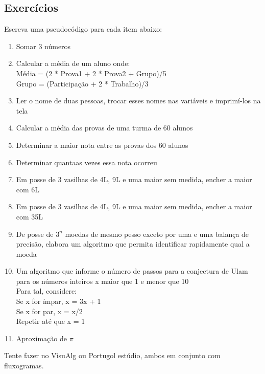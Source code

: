 \documentclass[12pt,a4paper]{article} %
\begin{document}
		\subsection{Exercícios}
		Escreva uma pseudocódigo para cada item abaixo:
			\begin{enumerate}
				\item Somar 3 números
				\item Calcular a média de um aluno onde:\\Média = (2 * Prova1 + 2 * Prova2 + Grupo)/5\\Grupo = (Participação + 2 * Trabalho)/3
				\item Ler o nome de duas pessoas, trocar esses nomes nas variáveis e imprimí-los na tela
				\item Calcular a média das provas de uma turma de 60 alunos
				\item Determinar a maior nota entre as provas dos 60 alunos
				\item Determinar quantaas vezes essa nota ocorreu
				\item Em posse de 3 vasilhas de 4L, 9L e uma maior sem medida, encher a maior com 6L
				\item Em posse de 3 vasilhas de 4L, 9L e uma maior sem medida, encher a maior com 35L
				\item De posse de $3^{n}$ moedas de mesmo pesso exceto por uma e uma balança de precisão, elabora um algoritmo que permita identificar rapidamente qual a moeda
				\item Um algoritmo que informe o número de passos para a conjectura de Ulam para os números inteiros x maior que 1 e menor que 10\\Para tal, considere:\\Se x for ímpar, x = 3x + 1\\Se x for par, x = x/2\\Repetir até que x = 1
				\item Aproximação de $\pi$
			\end{enumerate}
		Tente fazer no VisuAlg ou Portugol estúdio, ambos em conjunto com fluxogramas.
\end{document}
